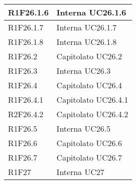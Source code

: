 \begin{center}
\begin{longtable}{|p{22mm}|p{44mm}|}
R1F26.1.6 &
Interna \newline
UC26.1.6 \newline
\\
\hline

R1F26.1.7 &
Interna \newline
UC26.1.7 \newline
\\
\hline

R1F26.1.8 &
Interna \newline
UC26.1.8 \newline
\\
\hline

R1F26.2 &
Capitolato \newline
UC26.2 \newline
\\
\hline

R1F26.3 &
Interna \newline
UC26.3 \newline
\\
\hline

R1F26.4 &
Capitolato \newline
UC26.4 \newline
\\
\hline

R1F26.4.1 &
Capitolato \newline
UC26.4.1 \newline
\\
\hline

R2F26.4.2 &
Capitolato \newline
UC26.4.2 \newline
\\
\hline

R1F26.5 &
Interna \newline
UC26.5 \newline
\\
\hline

R1F26.6 &
Capitolato \newline
UC26.6 \newline
\\
\hline

R1F26.7 &
Capitolato \newline
UC26.7 \newline
\\
\hline

R1F27 &
Interna \newline
UC27 \newline
\\
\hline


\end{longtable}
\end{center}
